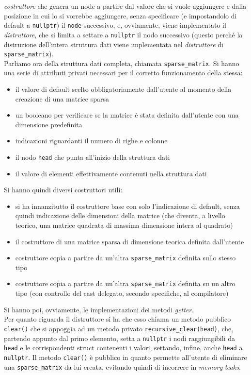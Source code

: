 \documentclass[a4paper,12pt, oneside]{article}
\begin{document}
\textit{costruttore} che genera un node a partire dal valore che si vuole
aggiungere e dalla posizione in cui lo si vorrebbe aggiungere, senza
specificare (e impostandolo di default a \texttt{nullptr}) il
\texttt{node} successivo, e, ovviamente, viene implementato il
\textit{distruttore}, che si limita a settare a \texttt{nullptr} il
nodo successivo (questo perché la distruzione dell'intera struttura
dati viene implementata nel \textit{distruttore} di
\texttt{sparse\_matrix}).\\
Parliamo ora della struttura dati completa, chiamata
\texttt{sparse\_matrix}. Si hanno una serie di attributi privati
necessari per il corretto funzionamento della stessa:
\begin{itemize}
  \item il valore di default scelto obbligatoriamente dall'utente al
  momento della creazione di una matrice sparsa
  \item un booleano per verificare se la matrice è stata definita
  dall'utente con una dimensione predefinita
  \item indicazioni riguardanti il numero di righe e colonne
  \item il nodo \texttt{head} che punta all'inizio della struttura
  dati
  \item il valore di elementi effettivamente contenuti nella struttura dati
\end{itemize}
Si hanno quindi diversi costruttori utili:
\begin{itemize}
  \item si ha innanzitutto il costruttore base con solo l'indicazione
  di default, senza quindi indicazione delle dimensioni della matrice
  (che diventa, a livello teorico, una matrice quadrata di massima
  dimensione intera al quadrato)
  \item il costruttore di una matrice sparsa di dimensione teorica
  definita dall'utente
  \item costruttore copia a partire da un'altra
  \texttt{sparse\_matrix} definita sullo stesso tipo
  \item costruttore copia a partire da un'altra
  \texttt{sparse\_matrix} definita su un altro tipo (con controllo del
  cast delegato, secondo specifiche, al compilatore)
\end{itemize}
Si hanno poi, ovviamente, le implementazioni dei metodi
\textit{getter}.\\
Per quanto riguarda il distruttore si ha che esso chiama un metodo
pubblico \texttt{clear()} che si appoggia ad un metodo privato
\texttt{recursive\_clear(head)}, che, partendo appunto dal primo
elemento, setta a \texttt{nullptr} i nodi raggiungibili da
\texttt{head} e le corrispondenti struct contenenti i valori,
 settando, infine, anche \texttt{head} a
\texttt{nullptr}. Il metodo \texttt{clear()} è pubblico in quanto
permette all'utente di eliminare una \texttt{sparse\_matrix} da lui
creata, evitando quindi di incorrere in \textit{memory leaks}.
\newpage
\end{document}
